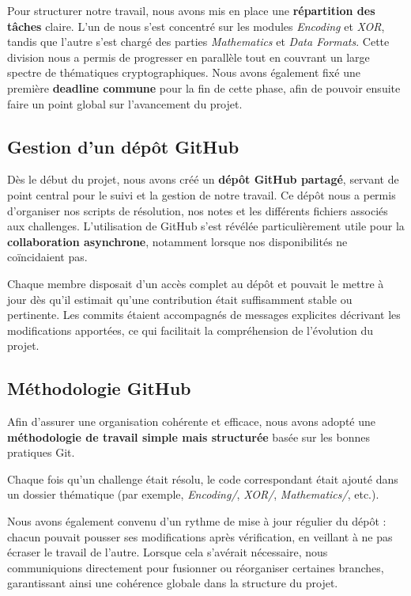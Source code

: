 \documentclass[12pt, a4paper]{article}
\begin{document}
    Pour structurer notre travail, nous avons mis en place une
    \textbf{répartition des tâches} claire. L’un de nous s’est concentré sur
    les modules \textit{Encoding} et \textit{XOR}, tandis que l’autre s’est
    chargé des parties \textit{Mathematics} et \textit{Data Formats}. Cette
    division nous a permis de progresser en parallèle tout en couvrant un
    large spectre de thématiques cryptographiques. Nous avons également fixé
    une première \textbf{deadline commune} pour la fin de cette phase, afin de
    pouvoir ensuite faire un point global sur l’avancement du projet.

    \subsection{Gestion d'un dépôt GitHub}
    Dès le début du projet, nous avons créé un \textbf{dépôt GitHub partagé},
    servant de point central pour le suivi et la gestion de notre travail. Ce
    dépôt nous a permis d’organiser nos scripts de résolution, nos notes et les
    différents fichiers associés aux challenges. L’utilisation de GitHub s’est
    révélée particulièrement utile pour la \textbf{collaboration asynchrone},
    notamment lorsque nos disponibilités ne coïncidaient pas.

    Chaque membre disposait d’un accès complet au dépôt et pouvait le mettre à
    jour dès qu’il estimait qu’une contribution était suffisamment stable ou
    pertinente. Les commits étaient accompagnés de messages explicites
    décrivant les modifications apportées, ce qui facilitait la compréhension
    de l’évolution du projet.

    \subsection{Méthodologie GitHub}
    Afin d’assurer une organisation cohérente et efficace, nous avons adopté une
    \textbf{méthodologie de travail simple mais structurée} basée sur les
    bonnes pratiques Git.

    Chaque fois qu’un challenge était résolu, le code correspondant était
    ajouté dans un dossier thématique (par exemple, \textit{Encoding/},
    \textit{XOR/}, \textit{Mathematics/}, etc.).

    Nous avons également convenu d’un rythme de mise à jour régulier du dépôt :
    chacun pouvait pousser ses modifications après vérification, en veillant à
    ne pas écraser le travail de l’autre. Lorsque cela s’avérait nécessaire,
    nous communiquions directement pour fusionner ou réorganiser certaines
    branches, garantissant ainsi une cohérence globale dans la structure du
    projet.
\end{document}
